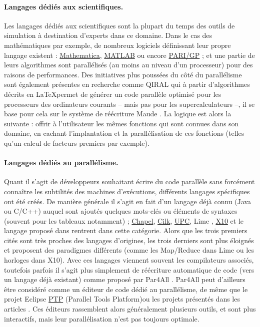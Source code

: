 \paragraph{Langages dédiés aux scientifiques.}
Les langages dédiés aux scientifiques sont la plupart du temps des outils de simulation à destination d'experts dans ce domaine. Dans le cas des mathématiques par exemple, de nombreux logiciels définissant leur propre langage existent : \textsf{\href{http://www.wolfram.com/mathematica/}{Mathematica}}, \textsf{\href{http://fr.mathworks.com/}{MATLAB}} ou encore \textsf{\href{http://pari.math.u-bordeaux.fr/}{PARI/GP}} ; et une partie de leurs algorithmes sont parallélisés (au moins au niveau d'un processeur) pour des raisons de performances. Des initiatives plus poussées du côté du parallélisme sont également présentes en recherche comme \textsf{QIRAL} \cite{Art13,Art14} qui à partir d'algorithmes décrits en \LaTeX permet de générer un code parallèle optimisé pour les processeurs des ordinateurs courants -- mais pas pour les supercalculateurs --, il se base pour cela sur le système de réécriture \textsf{Maude} \cite{Art12}. La logique est alors la suivante : offrir à l'utilisateur les mêmes fonctions qui sont connues dans son domaine, en cachant l'implantation et la parallélisation de ces fonctions (telles qu'un calcul de facteurs premiers par exemple).

\paragraph{Langages dédiés au parallélisme.}
Quant il s'agit de développeurs souhaitant écrire du code parallèle sans forcément connaître les subtilités des machines d'exécutions, différents langages spécifiques ont été créés. De manière générale il s'agit en fait d'un langage déjà connu (\textsf{Java} ou \textsf{C/C++}) auquel sont ajoutés quelques mots-clés ou éléments de syntaxes (souvent pour les tableaux notamment) ; \textsf{\href{http://chapel.cray.com/}{Chapel}}, \textsf{\href{https://www.cilkplus.org/}{Cilk}}, \textsf{\href{http://upc.lbl.gov/}{UPC}}, \textsf{Lime} \cite{Art8}, \textsf{\href{http://x10-lang.org/}{X10}} et le langage proposé dans\cite{Art10} rentrent dans cette catégorie. Alors que les trois premiers cités sont très proches des langages d'origines, les trois derniers sont plus éloignés et proposent des paradigmes différents (comme les Map/Reduce dans \textsf{Lime} ou les horloges dans \textsf{X10}). Avec ces langages viennent souvent les compilateurs associés, toutefois parfois il s'agit plus simplement de réécriture automatique de code (vers un langage déjà existant) comme proposé par \textsf{Par4All} \cite{Ths2}. \textsf{Par4All} peut d'ailleurs être considéré comme un éditeur de code dédié au parallélisme, de même que le projet \textsf{Eclipse \href{http://www.eclipse.org/ptp/}{PTP}} (Parallel Tools Platform)ou les projets présentés dans les articles \cite{Art23,Art25}. Ces éditeurs rassemblent alors généralement plusieurs outils, et sont plus interactifs, mais leur parallélisation n'est pas toujours optimale.


